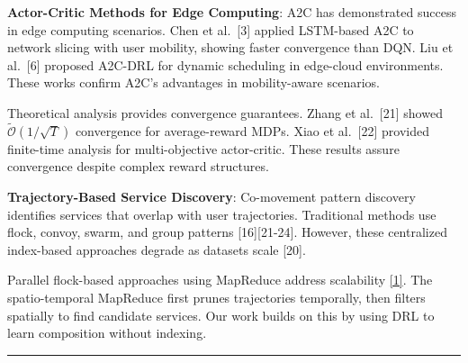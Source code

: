 \textbf{Actor-Critic Methods for Edge Computing}: A2C has demonstrated
success in edge computing scenarios. Chen et al.~{[}3{]} applied
LSTM-based A2C to network slicing with user mobility, showing faster
convergence than DQN. Liu et al.~{[}6{]} proposed A2C-DRL for dynamic
scheduling in edge-cloud environments. These works confirm A2C's
advantages in mobility-aware scenarios.

Theoretical analysis provides convergence guarantees. Zhang et
al.~{[}21{]} showed \(\tilde{\mathcal{O}}(1/\sqrt{T})\) convergence for
average-reward MDPs. Xiao et al.~{[}22{]} provided finite-time analysis
for multi-objective actor-critic. These results assure convergence
despite complex reward structures.

\textbf{Trajectory-Based Service Discovery}: Co-movement pattern
discovery identifies services that overlap with user trajectories.
Traditional methods use flock, convoy, swarm, and group patterns
{[}16{]}{[}21-24{]}. However, these centralized index-based approaches
degrade as datasets scale {[}20{]}.

Parallel flock-based approaches using MapReduce address scalability
\hyperlink{cite.neiat2021}{\hyperlink{cite.neiat2021}{[1]}}. The spatio-temporal MapReduce first prunes trajectories
temporally, then filters spatially to find candidate services. Our work
builds on this by using DRL to learn composition without indexing.

\begin{center}\rule{0.5\linewidth}{0.5pt}\end{center}

\hypertarget{proposed-a2c-based-framework}{}
